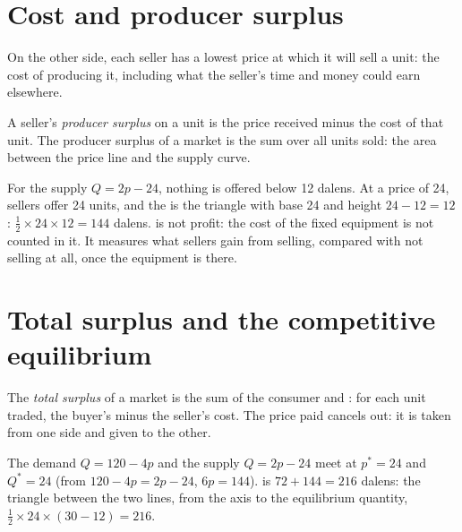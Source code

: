 \section{Cost and producer surplus}\label{sec:g10:surplus-and-efficiency:producer}

On the other side, each seller has a lowest price at which it will sell a unit: the cost of producing it, including what the seller's time and
money could earn elsewhere.

\begin{definition}\label{def:g10:surplus-and-efficiency:producer-surplus}
A seller's \emph{producer surplus} on a unit is the price received minus the cost of that unit. The producer surplus of a
market is the sum over all units sold: the area between the price line and the supply curve.
\end{definition}

For the supply $Q = 2p - 24$, nothing is offered below 12 dalens. At a price of 24, sellers offer 24 units, and the  is the triangle
with base 24 and height $24 - 12 = 12$: $\tfrac12 \times 24 \times 12 = 144$ dalens.  is not profit: the cost of the fixed equipment
is not counted in it. It measures what sellers gain from selling, compared with not selling at all, once the equipment is there.

\section{Total surplus and the competitive equilibrium}\label{sec:g10:surplus-and-efficiency:total}

\begin{definition}\label{def:g10:surplus-and-efficiency:total-surplus}
The \emph{total surplus} of a market is the sum of the consumer and : for each unit traded, the buyer's
 minus the seller's cost. The price paid cancels out: it is taken from one side and given to the other.
\end{definition}

The demand $Q = 120 - 4p$ and the supply $Q = 2p - 24$ meet at $p^* = 24$ and $Q^* = 24$ (from $120 - 4p = 2p - 24$, $6p = 144$).  is
$72 + 144 = 216$ dalens: the triangle between the two lines, from the axis to the equilibrium quantity, $\tfrac12 \times 24 \times (30 - 12) = 216$.

